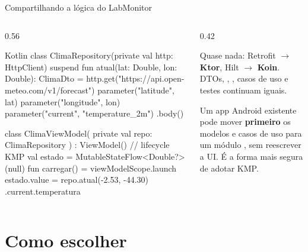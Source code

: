 \documentclass[aspectratio=169,10pt]{beamer}
\begin{document}
\begin{frame}[fragile]{Compartilhando a lógica do LabMonitor}
  \begin{columns}[T]
    \begin{column}{0.56\textwidth}
\begin{codigo}[title=shared/commonMain/ClimaRepository.kt]{Kotlin}
class ClimaRepository(private val http: HttpClient) {
  suspend fun atual(lat: Double, lon: Double): ClimaDto =
    http.get("https://api.open-meteo.com/v1/forecast") {
      parameter("latitude", lat)
      parameter("longitude", lon)
      parameter("current", "temperature_2m")
    }.body()
}

class ClimaViewModel(
  private val repo: ClimaRepository
) : ViewModel() {                 // lifecycle KMP
  val estado = MutableStateFlow<Double?>(null)
  fun carregar() = viewModelScope.launch {
    estado.value = repo.atual(-2.53, -44.30)
      .current.temperatura
  }
}
\end{codigo}
    \end{column}
    \begin{column}{0.42\textwidth}
      \begin{conceito}
        Quase nada: Retrofit $\rightarrow$ \textbf{Ktor}, Hilt $\rightarrow$ \textbf{Koin}. DTOs, , , casos de uso e testes continuam iguais.
      \end{conceito}
      \begin{dica}
        Um app Android existente pode mover \textbf{primeiro} os modelos e casos de uso para um módulo , sem reescrever a UI. É a forma mais segura de adotar KMP.
      \end{dica}
    \end{column}
  \end{columns}
\end{frame}

\section{Como escolher}
\end{document}
